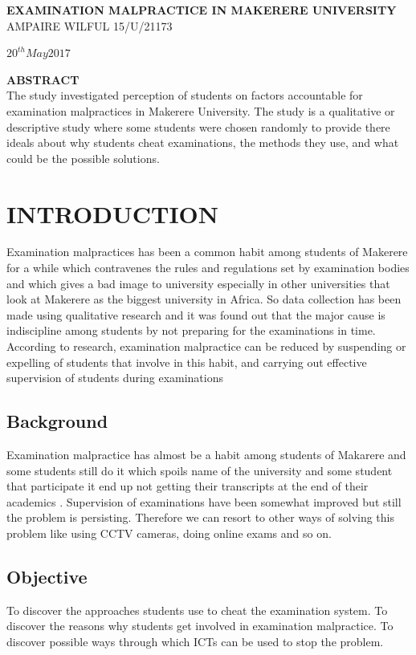 \documentclass [8 pt]{article}
\begin{document}
\begin {titlepage}
\vspace *{\fill}
\begin {center}
\Huge{\textbf{EXAMINATION MALPRACTICE IN MAKERERE UNIVERSITY}}\\ [2CM]
\Large { AMPAIRE WILFUL 15/U/21173 }  

  $20^{th} May 2017$\\ 
\setlength{\topmargin}{-1cm}
\end {center}
\vspace *{\fill}
\end {titlepage}


\large {\textbf {ABSTRACT}}\\
The study investigated perception of students on factors accountable for examination malpractices in Makerere University. The study is a qualitative or descriptive study where some students were chosen randomly to provide there ideals about why students cheat examinations, the methods they use, and what could be the possible solutions. 
\section {INTRODUCTION}
Examination malpractices has been a common habit among students of Makerere for a while which contravenes the rules and regulations set by examination bodies and  which gives a bad image to university especially in other universities that look at Makerere as the biggest university in Africa. So data collection has been made using qualitative research and it was found out that the major cause is indiscipline among students by not preparing for the examinations in time. According to research, examination malpractice can be reduced by suspending or expelling of students that involve in this habit, and carrying out effective supervision of students during examinations
\subsection { Background}
Examination malpractice has almost be a habit among students of Makarere and some students still do it which spoils name of the university and some student that participate it end up not getting their transcripts at the end of their academics . Supervision of examinations have been somewhat improved but still the problem is persisting. Therefore we can resort to other ways of solving this problem like using CCTV cameras, doing online exams and so on.
\subsection {Objective}
To discover the approaches students use to cheat the examination system.
To discover the reasons why students get involved in examination malpractice.
To discover possible ways through which ICTs can be used to stop the problem.
\end{document}
